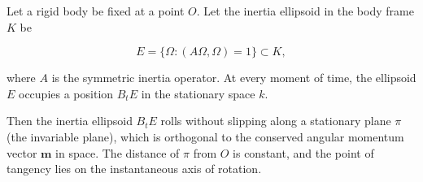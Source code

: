 Let a rigid body be fixed at a point $O$. Let the inertia ellipsoid in the body frame $K$ be

$$E = \{ \Omega : (A \Omega, \Omega) = 1 \} \subset K,$$

where $A$ is the symmetric inertia operator. At every moment of time, the ellipsoid $E$ occupies a position $B_t E$ in the stationary space $k$.

Then the inertia ellipsoid $B_t E$ rolls without slipping along a stationary plane $\pi$ (the invariable plane), which is orthogonal to the conserved angular momentum vector $\mathbf{m}$ in space. The distance of $\pi$ from $O$ is constant, and the point of tangency lies on the instantaneous axis of rotation.
